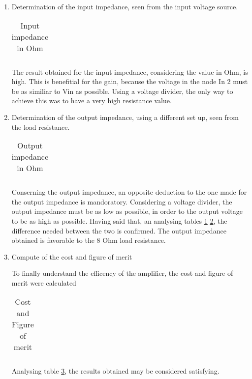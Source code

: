 \begin{enumerate}
\item Determination of the input impedance, seen from the input voltage source.

\begin{table}[h]
  \centering
  \begin{tabular}{|l|r|}
    \hline    
   
   \end{tabular}
  \caption{Input impedance in Ohm}
    \label{tab:ZI}
\end{table}

\par The result obtained for the input impedance, considering the value in Ohm, is high. This is benefitial for the gain, because the voltage in the node In 2 must be as similiar to Vin as possible. Using a voltage divider, the only way to achieve this was to have a very high resistance value.

\item Determination of the output impedance, using a different set up, seen from the load resistance. 

\begin{table}[h]
  \centering
  \begin{tabular}{|l|r|}
    \hline    
   
   \end{tabular}
  \caption{Output impedance in Ohm}
  
  \label{tab:ZO}
\end{table}


Conserning the output impedance, an opposite deduction to the one made for the output impedance is mandoratory. Considering a voltage divider, the output impedance must be as low as possible, in order to the output voltage to be as high as possible. Having said that, an analysing tables \ref{tab:ZI} \ref{tab:ZO}, the difference needed between the two is confirmed. The output impedance obtained is favorable to the 8 Ohm load resistance.

\item Compute of the cost and figure of merit
\par To finally understand the efficency of the amplifier, the cost and figure of merit were calculated

\begin{table}[ht]
  \centering
  \begin{tabular}{|l|r|}
    \hline    
   
   \end{tabular}
  \caption{Cost and Figure of merit}
  \label{tab:cost}
\end{table}

Analysing table \ref{tab:cost}, the results obtained may be considered satisfying.


\end{enumerate}



